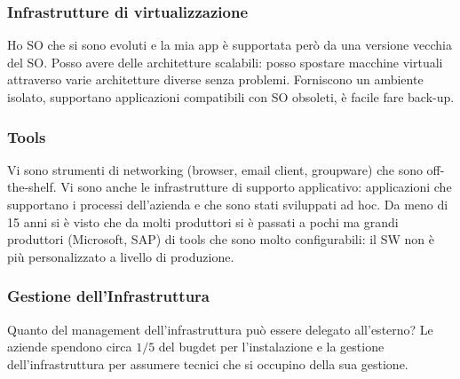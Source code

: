\subsubsection{Infrastrutture di virtualizzazione}
\label{subs:Infrastrutture di virtualizzazione}
Ho SO che si sono evoluti e la mia app \`e supportata per\`o da una versione vecchia del SO.
Posso avere delle architetture scalabili: posso spostare macchine virtuali attraverso
varie architetture diverse senza problemi.
Forniscono un ambiente isolato, supportano applicazioni compatibili con SO obsoleti, \`e facile
fare back-up.



\subsubsection{Tools}
\label{subs:Tools}
Vi sono strumenti di networking (browser, email client, groupware) che sono off-the-shelf.
Vi sono anche le infrastrutture di supporto applicativo: applicazioni che supportano i processi dell'azienda
e che sono stati sviluppati ad hoc.
Da meno di 15 anni si \`e visto che da molti produttori si \`e passati a pochi ma grandi produttori
(Microsoft, SAP) di tools che sono molto configurabili: il SW non \`e pi\`u personalizzato
a livello di produzione.

\subsubsection{Gestione dell'Infrastruttura}
\label{subs:Gestione dell'Infrastruttura}
Quanto del management dell'infrastruttura pu\`o essere delegato all'esterno?
Le aziende spendono circa $1/5$ del bugdet per l'instalazione e la gestione dell'infrastruttura
per assumere tecnici che si occupino della sua gestione.
